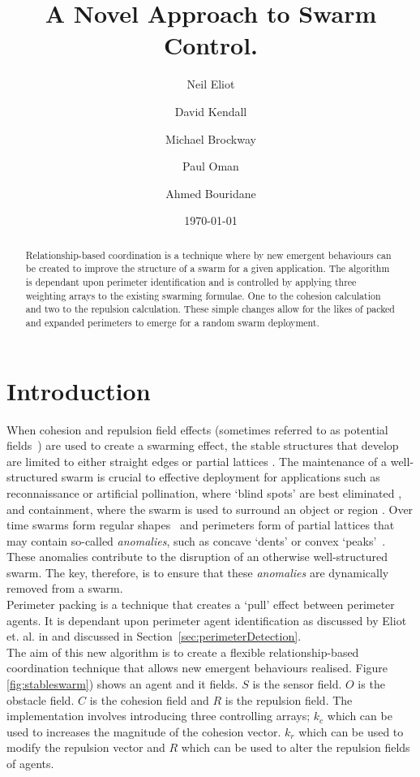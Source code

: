 \documentclass[12pt,a4paper]{IEEEtran}
\title{A Novel Approach to Swarm Control.}
\author[1,*]{Neil Eliot}
\author[ ]{David Kendall}
\author[ ]{Michael Brockway}
\author[1]{Paul Oman}
\author[1]{Ahmed Bouridane}
\affil[1] {Northumbria University, Faculty of Engineering and Environment, Department of Computer and Information Sciences}
\affil[*] {Corresponding author: Dr Neil Eliot, neil.eliot@northumbria.ac.uk}
\date{\today}
\newcommand{\kc}{\mathit{k_c}}
\newcommand{\kr}{\mathit{k_r}}
\newcommand{\rb}{\mathit{R}}
\begin{document}
\maketitle

\begin{abstract}
Relationship-based coordination is a technique where by new emergent behaviours can be created to improve the structure of a swarm for a given application. The algorithm is dependant upon perimeter identification and is controlled by applying three weighting arrays to the existing swarming formulae. One to the cohesion calculation and two to the repulsion calculation. These simple changes allow for the likes of packed and expanded perimeters to emerge for a random swarm deployment.
\end{abstract}

\section{Introduction}
When cohesion and repulsion field effects (sometimes referred to as potential fields~\cite{BAF:06,eliot2018metric,VG:05,SW:03,Son2017,liang2019swarm}) are used to create a swarming effect, the stable structures that develop are limited to either straight edges or partial lattices \cite{eliot2017methods}. The maintenance of a well-structured swarm is crucial to effective deployment for applications such as reconnaissance or artificial pollination, where `blind spots' are best eliminated \cite{elamvazhuthi2015optimal}, and containment, where the swarm is used to surround an object or region \cite{cao2012distributed}. Over time swarms form regular shapes~\cite{RAZ:13} and perimeters form of partial lattices that may contain so-called \textit{anomalies}, such as concave `dents' or convex `peaks'~\cite{eliot2019void}. These anomalies contribute to the disruption of an otherwise well-structured swarm. The key, therefore, is to ensure that these \textit{anomalies} are dynamically removed from a swarm.\\
Perimeter packing is a technique that creates a `pull' effect between perimeter agents. It is dependant upon perimeter agent identification as discussed by Eliot et. al. in \cite{eliot2017methods, eliot2018metric, eliot2019void} and discussed in Section~\ref{sec:perimeterDetection}.\\
The aim of this new algorithm is to create a flexible relationship-based coordination technique that allows new emergent behaviours realised. Figure \ref{fig:stableswarm}) shows an agent and it fields. $S$ is the sensor field. $O$ is the obstacle field. $C$ is the cohesion field and $\rb$ is the repulsion field. The implementation involves introducing three controlling arrays; $\kc$ which can be used to increases the magnitude of the cohesion vector. $\kr$ which can be used to modify the repulsion vector and $\rb$ which can be used to alter the repulsion fields of agents.\\
\end{document}
